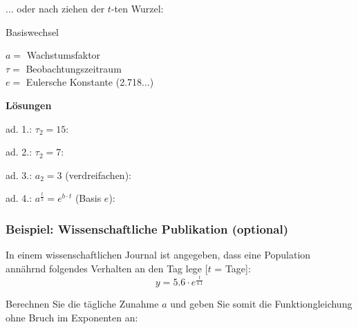 ... oder nach ziehen der $t$-ten Wurzel:

\begin{gesetz}{Basiswechsel}{}

  \begin{center}\end{center}
  
  $a=$ Wachstumsfaktor\\
  $\tau=$ Beobachtungszeitraum\\
  $e=$ Eulersche Konstante (2.718...)
\end{gesetz}
\newpage


\textbf{Lösungen}

ad. 1.: $\tau_2=15$:

ad. 2.: $\tau_2=7$:

ad. 3.: $a_2 = 3$ (verdreifachen):

ad. 4.: $a^\frac{t}5 = e^{b\cdot{}t}$ (Basis $e$):

\newpage


\subsubsection{Beispiel: Wissenschaftliche Publikation (optional)}
In einem wissenschaftlichen Journal ist angegeben, dass eine Population annährnd folgendes Verhalten an den Tag lege [$t$ = Tage]:
$$y = 5.6\cdot{} e^{\frac{t}{4.1}}$$

Berechnen Sie die tägliche Zunahme $a$ und geben Sie somit die Funktiongleichung ohne Bruch im Exponenten an:

